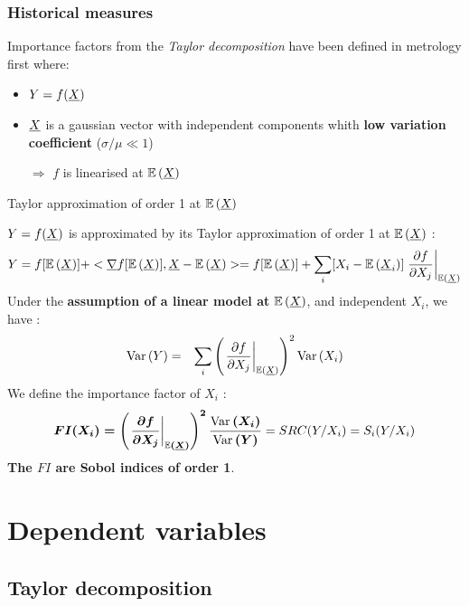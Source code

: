 \documentclass[8pt]{beamer}
\begin{document}
\begin{frame}
\frametitle{Historical measures}

\small
  Importance factors from the \emph{Taylor decomposition} have been defined in metrology first where:
  \begin{itemize}
  \item $Y=f({\underline{X}})$
   \item ${\underline{X}}$ is a gaussian vector with independent components whith {\bf low variation coefficient} ($\sigma / \mu \ll 1$)
   \item[$\Longrightarrow$] $f$ is linearised at $\mathbb{E}\left( {\underline{X}} \right)$
  \end{itemize}


  \begin{block}{Taylor approximation of order 1 at $\mathbb{E}\left( {\underline{X}} \right)$}

$Y=f({\underline{X}})$ is approximated by its  \alert{ Taylor approximation of order 1 at $\mathbb{E}\left( {\underline{X}} \right)$ } :
\begin{equation}
Y = f[\mathbb{E}\left( {\underline{X}} \right)] + <{\underline{\nabla }}f[\mathbb{E}\left( {\underline{X}} \right)], {\underline{X}} - \mathbb{E}\left( {\underline{X}} \right)> =  f[\mathbb{E}\left( {\underline{X}} \right)] + \sum_i [X_i-\mathbb{E}\left( {\underline{X}}_i \right)]\left.\frac{\partial f}{\partial X_j}\right|_{\mathbb{E}\left( {\underline{X}} \right)}
\end{equation}
Under the  {\bf assumption of a linear model at} $\mathbb{E}\left( {\underline{X}} \right)$, and  \alert{independent $X_i$}, we have :
\begin{eqnarray}
\mbox{Var}\left( Y \right) & = & \sum_i \left(\left.\frac{\partial f}{\partial X_j}\right|_{\mathbb{E}\left( {\underline{X}} \right)}\right)^2 \mbox{Var}\left( X_i \right)
\end{eqnarray}
We define the  \alert{importance factor of $X_i$} :
$$
\boldsymbol{
FI(X_i) = \left(\left.\frac{\partial f}{\partial X_j}\right|_{\mathbb{E}\left( {\underline{X}} \right)}\right)^2 \frac{\mbox{Var}\left( X_i \right)}{\mbox{Var}\left( Y \right)}
} = SRC(Y / X_i) = S_i(Y/X_i)
$$
{\bf The $FI$ are Sobol indices of order 1}.
  
\end{block}

  \end{frame}





\section{Dependent variables}

\subsection{Taylor decomposition}
\end{document}
